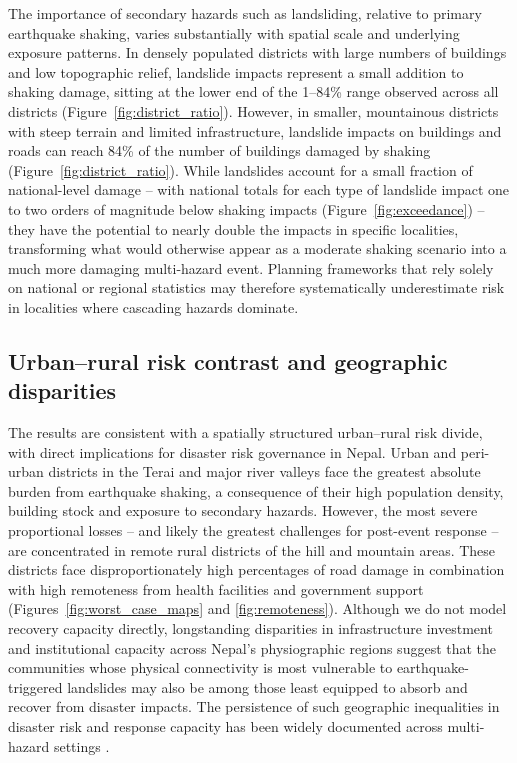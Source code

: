 \documentclass[preprint,12pt,authoryear]{elsarticle}
\begin{document}
The importance of secondary hazards such as landsliding, relative to primary earthquake shaking, varies substantially with spatial scale and underlying exposure patterns. In densely populated districts with large numbers of buildings and low topographic relief, landslide impacts represent a small addition to shaking damage, sitting at the lower end of the 1--84\% range observed across all districts (Figure~\ref{fig:district_ratio}). However, in smaller, mountainous districts with steep terrain and limited infrastructure, landslide impacts on buildings and roads can reach 84\% of the number of buildings damaged by shaking (Figure~\ref{fig:district_ratio}). While landslides account for a small fraction of national-level damage -- with national totals for each type of landslide impact one to two orders of magnitude below shaking impacts (Figure~\ref{fig:exceedance}) -- they have the potential to nearly double the impacts in specific localities, transforming what would otherwise appear as a moderate shaking scenario into a much more damaging multi-hazard event. Planning frameworks that rely solely on national or regional statistics may therefore systematically underestimate risk in localities where cascading hazards dominate.

\subsection{Urban--rural risk contrast and geographic disparities}

The results are consistent with a spatially structured urban--rural risk divide, with direct implications for disaster risk governance in Nepal. Urban and peri-urban districts in the Terai and major river valleys face the greatest absolute burden from earthquake shaking, a consequence of their high population density, building stock and exposure to secondary hazards. However, the most severe proportional losses -- and likely the greatest challenges for post-event response -- are concentrated in remote rural districts of the hill and mountain areas. These districts face disproportionately high percentages of road damage in combination with high remoteness from health facilities and government support (Figures~\ref{fig:worst_case_maps} and \ref{fig:remoteness}). Although we do not model recovery capacity directly, longstanding disparities in infrastructure investment and institutional capacity across Nepal's physiographic regions \citep{NationalPlanningCommission2014} suggest that the communities whose physical connectivity is most vulnerable to earthquake-triggered landslides may also be among those least equipped to absorb and recover from disaster impacts. The persistence of such geographic inequalities in disaster risk and response capacity has been widely documented across multi-hazard settings \citep{Wisner2004}.
\end{document}
